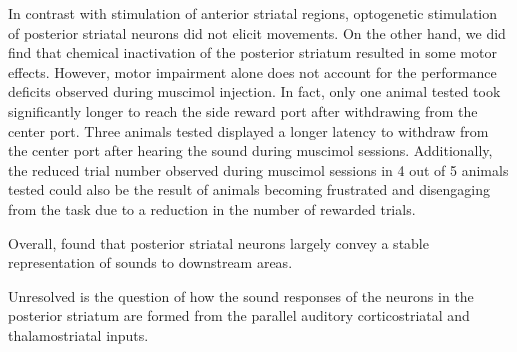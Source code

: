 In contrast with stimulation of anterior striatal regions, optogenetic stimulation of posterior striatal neurons did not elicit movements. 
%
On the other hand, we did find that chemical inactivation of the posterior striatum resulted in some motor effects.
%
However, motor impairment alone does not account for the performance deficits
observed during muscimol injection.
%
In fact, only one animal tested took significantly longer to reach the side
reward port after withdrawing from the center port.
%
Three animals tested displayed a longer latency to withdraw from the center port
after hearing the sound during muscimol sessions. 
%
Additionally, the reduced trial number observed during muscimol sessions in 4 out of 5 animals tested could also be the result of animals becoming frustrated and disengaging from the task due to a reduction in the number of rewarded trials.



Overall, \citet{Guo2018} found that posterior striatal neurons largely convey a stable representation of sounds to downstream areas.

Unresolved is the question of how the sound responses of the neurons in the posterior striatum are formed from the parallel auditory corticostriatal and thalamostriatal inputs.
%

